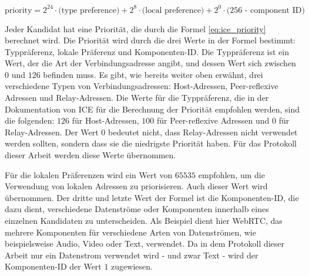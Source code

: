 \begin{equation}
    \label{eq:ice_priority}
    \text{priority} = \text{2}^{24} \cdot \text{(type preference)} + \text{2}^{8} \cdot \text{(local preference)} + \text{2}^{0} \cdot \text{(256 - component ID)}
\end{equation}

\noindent Jeder Kandidat hat eine Priorität, die durch die Formel \ref{eq:ice_priority} berechnet wird. Die Priorität wird durch die drei Werte in der Formel bestimmt: Typpräferenz, lokale Präferenz und Komponenten-ID. Die Typpräferenz ist ein Wert, der die Art der Verbindungsadresse angibt, und dessen Wert sich zwischen $0$ und $126$ befinden muss.
Es gibt, wie bereits weiter oben erwähnt, drei verschiedene Typen von Verbindungsadressen: Host-Adressen, Peer-reflexive Adressen und Relay-Adressen.
Die Werte für die Typpräferenz, die in der Dokumentation von ICE für die Berechnung der Priorität empfohlen werden, sind die folgenden: $126$ für Host-Adressen, $100$ für Peer-reflexive Adressen und $0$ für Relay-Adressen. Der Wert $0$ bedeutet nicht, dass Relay-Adressen nicht verwendet werden sollten, sondern dass sie die niedrigste Priorität haben. Für das Protokoll dieser Arbeit werden diese Werte übernommen.

Für die lokalen Präferenzen wird ein Wert von $65535$ empfohlen, um die Verwendung von lokalen Adressen zu priorisieren. Auch dieser Wert wird übernommen. Der dritte und letzte Wert der Formel ist die Komponenten-ID, die dazu dient, verschiedene Datenströme oder Komponenten innerhalb eines einzelnen Kandidaten zu unterscheiden. Als Beispiel dient hier WebRTC, das mehrere Komponenten für verschiedene Arten von Datenströmen, wie beispielsweise Audio, Video oder Text, verwendet. Da in dem Protokoll dieser Arbeit nur ein Datenstrom verwendet wird - und zwar Text - wird der Komponenten-ID der Wert $1$ zugewiesen.


